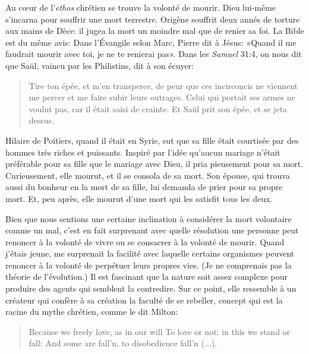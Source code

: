 \documentclass[a4paper, 12pt]{article}
\begin{document}
Au cœur de l'\textit{ethos} chrétien se trouve la volonté de mourir. Dieu
lui-même s'incarna pour souffrir une mort terrestre. Origène souffrit deux annés
de torture aux mains de Dèce: il jugea la mort un moindre mal que de renier sa
foi. La Bible est du même avis: Dans l'Évangile selon Marc, Pierre dit à Jésus:
«Quand il me faudrait mourir avec toi, je ne te renierai pas». Dans les
\textit{Samuel} 31:4, on nous dit que Saül, vaincu par les Philistins, dit à son
écuyer:

\begin{quote}
Tire ton épée, et m'en transperce, de peur que ces incirconcis ne viennent me
percer et me faire subir leurs outrages. Celui qui portait ses armes ne voulut
pas, car il était saisi de crainte. Et Saül prit son épée, et se jeta dessus.
\end{quote}

Hilaire de Poitiers, quand il était en Syrie, sut que sa fille était courtisée
par des hommes très riches et puissants. Inspiré par l'idée qu'aucun mariage
n'était préférable pour sa fille que le mariage avec Dieu, il pria pieusement
pour sa mort. Curieusement, elle mourut, et il se consola de sa mort. Son
épouse, qui trouva aussi du bonheur en la mort de sa fille, lui demanda de prier
pour sa propre mort. Et, peu après, elle mourut d'une mort qui les satisfit tous
les deux.

Bien que nous sentions une certaine inclination à considérer la mort volontaire
comme un mal, c'est en fait surprenant avec quelle résolution une personne peut
renoncer à la volonté de vivre ou se consacrer à la volonté de mourir. Quand
j'étais jeune, me surprenait la facilité avec laquelle certains organismes
peuvent renoncer à la volonté de perpétuer leurs propres vies. (Je ne comprenais
pas la théorie de l'évolution.) Il est fascinant que la nature soit assez
complexe pour produire des agents qui semblent la contredire. Sur ce point, elle
ressemble à un créateur qui confère à sa création la faculté de se rebeller,
concept qui est la racine du mythe chrétien, comme le dit Milton:

\begin{quote}
Because we freely love, as in our will\newline
To love or not; in this we stand or fall:\newline
And some are fall'n, to disobedience fall'n (...).
\end{quote}
\end{document}
